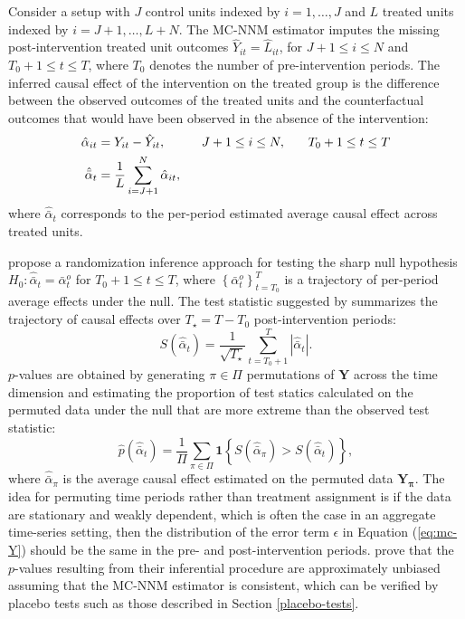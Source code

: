 \documentclass[12pt]{article}
\begin{document}
Consider a setup with $J$ control units indexed by $i=1, \ldots, J$ and $L$ treated units indexed by $i = J+1, \ldots, L+N$. The MC-NNM estimator imputes the missing post-intervention treated unit outcomes $\hat{Y}_{it} = \hat{L}_{it}$, for $J+1 \leq i \leq N$ and $T_0+1 \leq t \leq T$, where $T_0$ denotes the number of pre-intervention periods. The inferred causal effect of the intervention on the treated group is the difference between the observed outcomes of the treated units and the counterfactual outcomes that would have been observed in the absence of the intervention:
%
\begin{align}
\hat{\alpha}_{it} &= Y_{it} - \hat{Y}_{it}, \hspace{10mm} J+1 \leq i \leq N, \, \hspace{5mm} \, T_0+1 \leq t \leq T \\ 
\hat{\bar{\alpha}}_{t} & = \frac{1}{L} \sum^{N}_{i=J+1} \hat{\alpha}_{it},  \label{eq:avg-pointwise}
\end{align}
%
where $\hat{\bar{\alpha}}_{t}$ corresponds to the per-period estimated average causal effect across treated units. 

\citet{chernozhukov2017exact} propose a randomization inference approach for testing the sharp null hypothesis $H_0: \hat{\bar{\alpha}}_{t} = \bar{\alpha}^{o}_{t}$ for $T_0+1 \leq t \leq T$, where $\left\{\bar{\alpha}^{o}_{t}\right\}_{t=T_0}^T$ is a trajectory of per-period average effects under the null. The test statistic suggested by \citet{chernozhukov2017exact} summarizes the trajectory of causal effects over $T_\star = T-T_0$ post-intervention periods:
%
\begin{equation}
S (\hat{\bar{\alpha}}_{t}) = \frac{1}{\sqrt{T_\star}} \sum_{t=T_0 +1}^{T} |\hat{\bar{\alpha}}_{t}|.
\end{equation}
%
$p$-values are obtained by generating $\pi \in \Pi$ permutations of $\mathbf{Y}$ across the time dimension and estimating the proportion of test statics calculated on the permuted data under the null that are more extreme than the observed test statistic:
%
\begin{equation}
\hat{p} (\hat{\bar{\alpha}}_{t}) = \frac{1}{\Pi} \sum_{\pi \in \Pi} \textbf{1} \left\{S (\hat{\bar{\alpha}}_{\pi}) > S (\hat{\bar{\alpha}}_{t}) \right\}, \label{pvalue}
\end{equation}
%
where $\hat{\bar{\alpha}}_{\pi}$ is the average causal effect estimated on the permuted data $\mathbf{Y_\pi}$. The idea for permuting time periods rather than treatment assignment is if the data are stationary and weakly dependent, which is often the case in an aggregate time-series setting, then the distribution of the error term $\epsilon$ in Equation (\ref{eq:mc-Y}) should be the same in the pre- and post-intervention periods. \citet{chernozhukov2017exact} prove that the $p$-values resulting from their inferential procedure are approximately unbiased assuming that the MC-NNM estimator is consistent, which can be verified by placebo tests such as those described in Section \ref{placebo-tests}. 
\end{document}
